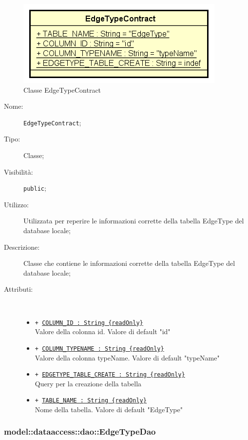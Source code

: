 \documentclass[../DefinizioneDiProdotto.tex]{subfiles}
\begin{document}
    \begin{figure}[H]
        \centering
        \includegraphics{img/EdgeTypeContract.png}
        \caption{Classe EdgeTypeContract}\label{fig:model::dataaccess::dao::EdgeTypeContract} 
    \end{figure}
    \begin{description}
\item[Nome:] \texttt{EdgeTypeContract};
\item[Tipo:] Classe;
\item[Visibilità:] \texttt{public};
\item[Utilizzo:] Utilizzata per reperire le informazioni corrette della tabella EdgeType del database locale;
\item[Descrizione:] Classe che contiene le informazioni corrette della tabella EdgeType del database locale;
\item[Attributi:] \
\begin{itemize}
\item \texttt{+ \underline{COLUMN\_ID : String \{readOnly\}}}\\
Valore della colonna id. Valore di default "id"

\item \texttt{+ \underline{COLUMN\_TYPENAME : String \{readOnly\}}}\\
Valore della colonna typeName. Valore di default "typeName"

\item \texttt{+ \underline{EDGETYPE\_TABLE\_CREATE : String \{readOnly\}}}\\
Query per la creazione della tabella

\item \texttt{+ \underline{TABLE\_NAME : String \{readOnly\}}}\\
Nome della tabella. Valore di default "EdgeType"

\end{itemize}
\end{description}

\subsubsection{model::dataaccess::dao::EdgeTypeDao}
\end{document}
